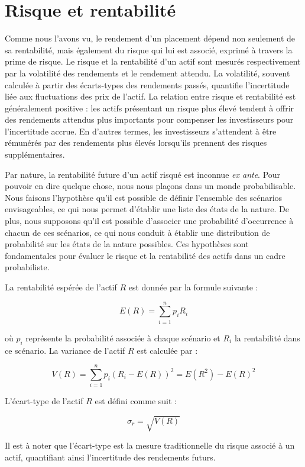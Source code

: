 \documentclass[a4paper, 12pt]{report}
\begin{document}
\section{Risque et rentabilité}

Comme nous l'avons vu, le rendement d'un placement dépend non seulement de sa rentabilité, mais également du risque qui lui est associé, exprimé à travers la prime de risque. Le risque et la rentabilité d'un actif sont mesurés respectivement par la volatilité des rendements et le rendement attendu. La volatilité, souvent calculée à partir des écarts-types des rendements passés, quantifie l'incertitude liée aux fluctuations des prix de l'actif. La relation entre risque et rentabilité est généralement positive : les actifs présentant un risque plus élevé tendent à offrir des rendements attendus plus importants pour compenser les investisseurs pour l'incertitude accrue. En d'autres termes, les investisseurs s'attendent à être rémunérés par des rendements plus élevés lorsqu'ils prennent des risques supplémentaires.

Par nature, la rentabilité future d'un actif risqué est inconnue \textit{ex ante}. Pour pouvoir en dire quelque chose, nous nous plaçons dans un monde probabilisable. Nous faisons l'hypothèse qu'il est possible de définir l'ensemble des scénarios envisageables, ce qui nous permet d'établir une liste des états de la nature. De plus, nous supposons qu'il est possible d'associer une probabilité d'occurrence à chacun de ces scénarios, ce qui nous conduit à établir une distribution de probabilité sur les états de la nature possibles. Ces hypothèses sont fondamentales pour évaluer le risque et la rentabilité des actifs dans un cadre probabiliste.

La rentabilité espérée de l'actif \( R \) est donnée par la formule suivante :

\[
E(R) = \sum_{i=1}^{n} p_i R_i
\]

où \( p_i \) représente la probabilité associée à chaque scénario et \( R_i \) la rentabilité dans ce scénario. La variance de l’actif \( R \) est calculée par :

\[
V(R) = \sum_{i=1}^{n} p_i (R_i - E(R))^2 = E(R^2) - E(R)^2
\]

L'écart-type de l’actif \( R \) est défini comme suit :

\[
\sigma_r = \sqrt{V(R)}
\]

Il est à noter que l'écart-type est la mesure traditionnelle du risque associé à un actif, quantifiant ainsi l'incertitude des rendements futurs.
\end{document}
